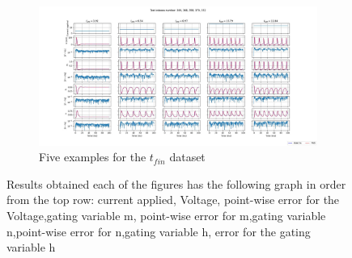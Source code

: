 \documentclass{article}
\begin{document}
\newpage
\begin{figure}
    \begin{subfigure}{.5\textwidth}

        \centering
        \includegraphics[width=1.8\linewidth]{images/t_f_error_HH.jpg}
        \caption{Five examples for the $t_{fin}$ dataset}
        \label{HH_err_t_f}
    \end{subfigure}
    \caption{Results obtained each of the figures has the following graph in order from the top row: current applied, Voltage, point-wise error for the Voltage,gating variable m, point-wise error for m,gating variable n,point-wise error for n,gating variable h, error for the gating variable h}
    \label{Grafici HH}
\end{figure}
\end{document}
